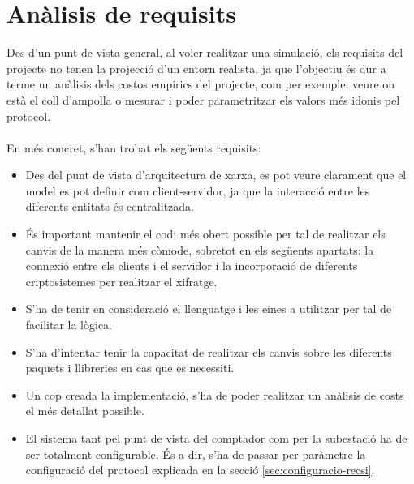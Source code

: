 \newcommand{\java}{Java 8}
\newcommand{\mavenLarge}{Apache Maven 3.6.3}
\newcommand{\maven}{\texttt{maven} }
\newcommand{\ciglib}{\texttt{CigLib} }
\newcommand{\toml}{\texttt{Toml}}
\newcommand{\dto}{\texttt{DTO} }
\newcommand{\factoryDTO}{\texttt{FactorySMSDatagram} }


\section{Anàlisis de requisits}
Des d'un punt de vista general, al voler realitzar una simulació, els requisits del projecte no tenen la projecció d'un entorn realista, ja que l'objectiu és dur a terme un anàlisis dels costos empírics del projecte, com per exemple, veure on està el coll d'ampolla o mesurar i poder parametritzar els valors més idonis pel protocol.
\\
\\
En més concret, s'han trobat els següents requisits:
\begin{itemize}
	\item Des del punt de vista d'arquitectura de xarxa, es pot veure clarament que el model es pot definir com client-servidor, ja que la interacció entre les diferents entitats és centralitzada.
	\item És important mantenir el codi més obert possible per tal de realitzar els canvis de la manera més còmode, sobretot en els següents apartats: la connexió entre els clients i el servidor i la incorporació de diferents criptosistemes per realitzar el xifratge.
	\item S'ha de tenir en consideració el llenguatge i les eines a utilitzar per tal de facilitar la lògica.
	\item S'ha d'intentar tenir la capacitat de realitzar els canvis sobre les diferents paquets i llibreries en cas que es necessiti.
	\item Un cop creada la implementació, s'ha de poder realitzar un anàlisis de costs el més detallat possible.
	\item El sistema tant pel punt de vista del comptador com per la subestació ha de ser totalment configurable. És a dir, s'ha de passar per paràmetre la configuració del protocol explicada en la secció \ref{sec:configuracio-recsi}.
\end{itemize}
